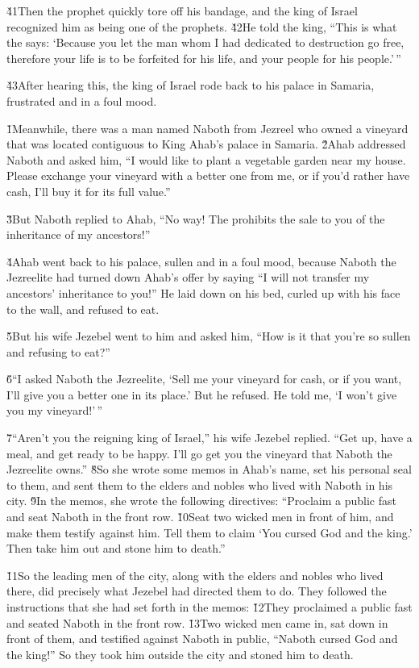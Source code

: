 \v{41}Then the prophet quickly tore off his bandage, and the king of Israel recognized him as being one of the prophets. \v{42}He told the king, ``This is what the  says: `Because you let the man whom I had dedicated to destruction go free, therefore your life is to be forfeited for his life, and your people for his people.'\,''

\v{43}After hearing this, the king of Israel rode back to his palace in Samaria, frustrated and in a foul mood.

\v{1}Meanwhile, there was a man named Naboth from Jezreel who owned a vineyard that was located contiguous to King Ahab's palace in Samaria. \v{2}Ahab addressed Naboth and asked him, ``I would like to plant a vegetable garden near my house. Please exchange your vineyard with a better one from me, or if you'd rather have cash, I'll buy it for its full value.''

\v{3}But Naboth replied to Ahab, ``No way! The  prohibits the sale to you of the inheritance of my ancestors!''

\v{4}Ahab went back to his palace, sullen and in a foul mood, because Naboth the Jezreelite had turned down Ahab's offer by saying ``I will not transfer my ancestors' inheritance to you!'' He laid down on his bed, curled up with his face to the wall, and refused to eat.

\v{5}But his wife Jezebel went to him and asked him, ``How is it that you're so sullen and refusing to eat?''

\v{6}``I asked Naboth the Jezreelite, `Sell me your vineyard for cash, or if you want, I'll give you a better one in its place.' But he refused. He told me, `I won't give you my vineyard!'\,''

\v{7}``Aren't you the reigning king of Israel,'' his wife Jezebel replied. ``Get up, have a meal, and get ready to be happy. I'll go get you the vineyard that Naboth the Jezreelite owns.'' \v{8}So she wrote some memos in Ahab's name, set his personal seal to them, and sent them to the elders and nobles who lived with Naboth in his city. \v{9}In the memos, she wrote the following directives: ``Proclaim a public fast and seat Naboth in the front row. \v{10}Seat two wicked men in front of him, and make them testify against him. Tell them to claim `You cursed God and the king.' Then take him out and stone him to death.''

\v{11}So the leading men of the city, along with the elders and nobles who lived there, did precisely what Jezebel had directed them to do. They followed the instructions that she had set forth in the memos: \v{12}They proclaimed a public fast and seated Naboth in the front row. \v{13}Two wicked men came in, sat down in front of them, and testified against Naboth in public, ``Naboth cursed God and the king!'' So they took him outside the city and stoned him to death.

